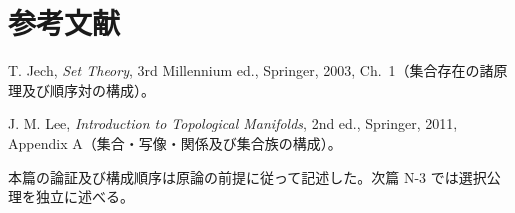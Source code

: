 \documentclass[a5paper,10pt,dvipdfmx]{jsarticle}
\theoremstyle{definition}
\theoremstyle{plain}
\begin{document}
\section*{参考文献}
\noindent T. Jech, \textit{Set Theory}, 3rd Millennium ed., Springer, 2003, Ch.~1（集合存在の諸原理及び順序対の構成）。\par
\noindent J. M. Lee, \textit{Introduction to Topological Manifolds}, 2nd ed., Springer, 2011, Appendix A（集合・写像・関係及び集合族の構成）。\par
\noindent 本篇の論証及び構成順序は原論の前提に従って記述した。次篇 N-3 では選択公理を独立に述べる。
\end{document}
